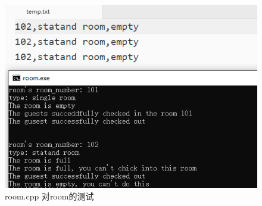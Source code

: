 \documentclass[UTF8]{ctexart}
\begin{document}
    \begin{figure}[H]
      \centering
      \includegraphics[scale=1]{test_room}
      \caption{room.cpp 对room的测试}
      \label{fig:test_room}
    \end{figure}
\end{document}
